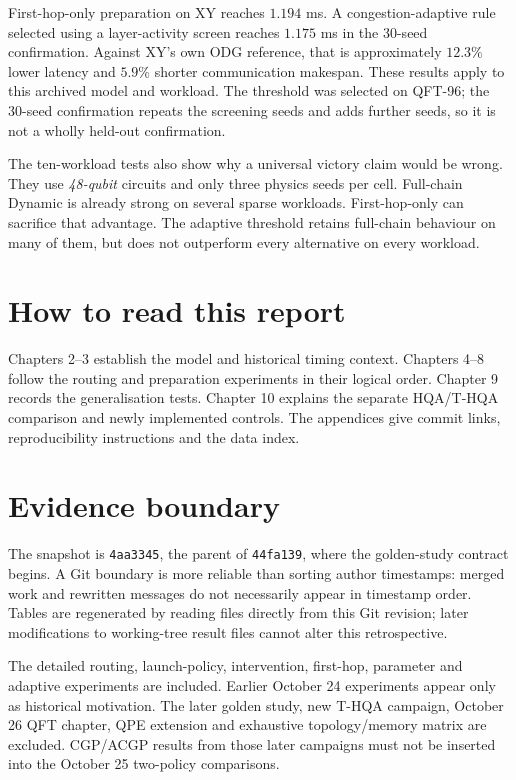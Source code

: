 \documentclass[11pt,a4paper,oneside]{report}
\begin{document}
First-hop-only preparation on XY reaches $1.194$ ms. A congestion-adaptive rule selected using a layer-activity screen reaches $1.175$ ms in the 30-seed confirmation. Against XY's own ODG reference, that is approximately $12.3\%$ lower latency and $5.9\%$ shorter communication makespan. These results apply to this archived model and workload. The threshold was selected on QFT-96; the 30-seed confirmation repeats the screening seeds and adds further seeds, so it is not a wholly held-out confirmation.

The ten-workload tests also show why a universal victory claim would be wrong. They use \emph{48-qubit} circuits and only three physics seeds per cell. Full-chain Dynamic is already strong on several sparse workloads. First-hop-only can sacrifice that advantage. The adaptive threshold retains full-chain behaviour on many of them, but does not outperform every alternative on every workload.

\section{How to read this report}
Chapters 2--3 establish the model and historical timing context. Chapters 4--8 follow the routing and preparation experiments in their logical order. Chapter 9 records the generalisation tests. Chapter 10 explains the separate HQA/T-HQA comparison and newly implemented controls. The appendices give commit links, reproducibility instructions and the data index.

\section{Evidence boundary}
The snapshot is \texttt{4aa3345}, the parent of \texttt{44fa139}, where the golden-study contract begins. A Git boundary is more reliable than sorting author timestamps: merged work and rewritten messages do not necessarily appear in timestamp order. Tables are regenerated by reading files directly from this Git revision; later modifications to working-tree result files cannot alter this retrospective.

The detailed routing, launch-policy, intervention, first-hop, parameter and adaptive experiments are included. Earlier October 24 experiments appear only as historical motivation. The later golden study, new T-HQA campaign, October 26 QFT chapter, QPE extension and exhaustive topology/memory matrix are excluded. CGP/ACGP results from those later campaigns must not be inserted into the October 25 two-policy comparisons.
\end{document}
